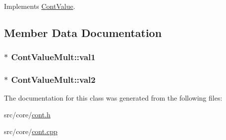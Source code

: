 Implements \hyperlink{a00086_ae3ce98084899bf1a873a1ec6bf15116e}{Cont\-Value}.



\subsection{Member Data Documentation}
\hypertarget{a00091_abdc19d5e3b2793c11011a2ccba833075}{
\subsubsection[{val1}]{$\ast$ Cont\-Value\-Mult\-::val1\hspace{0.3cm}{\ttfamily [private]}}}\label{a00091_abdc19d5e3b2793c11011a2ccba833075}
\hypertarget{a00091_a6515c303d54374dfc9454604cc6c07d1}{
\subsubsection[{val2}]{ $\ast$ Cont\-Value\-Mult\-::val2\hspace{0.3cm}{\ttfamily [private]}}}\label{a00091_a6515c303d54374dfc9454604cc6c07d1}


The documentation for this class was generated from the following files\-:\begin{DoxyCompactItemize}
\item 
src/core/\hyperlink{a00218}{cont.\-h}\item 
src/core/\hyperlink{a00217}{cont.\-cpp}\end{DoxyCompactItemize}
